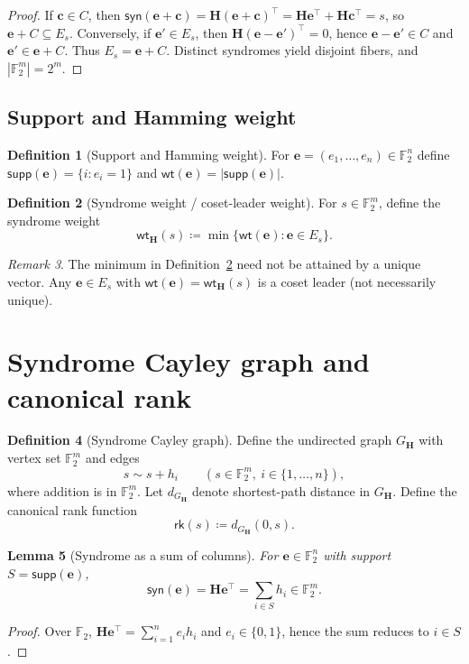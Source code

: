 \documentclass[11pt,twoside,leqno]{article}
\theoremstyle{definition}
\newtheorem{definition}{Definition}[section]
\theoremstyle{plain}
\newtheorem{lemma}[definition]{Lemma}
\theoremstyle{remark}
\newtheorem{remark}[definition]{Remark}
\newcommand{\Ftwo}{\mathbb{F}_2}
\newcommand{\wt}{\mathsf{wt}}
\newcommand{\supp}{\mathsf{supp}}
\newcommand{\syn}{\mathsf{syn}}
\newcommand{\rk}{\mathsf{rk}}
\newcommand{\HH}{\mathbf{H}}
\newcommand{\ee}{\mathbf{e}}
\newcommand{\cc}{\mathbf{c}}
\begin{document}
\begin{proof}
If $\cc\in C$, then $\syn(\ee+\cc)=\HH(\ee+\cc)^\top=\HH\ee^\top+\HH\cc^\top=s$,
so $\ee+C\subseteq E_s$. Conversely, if $\ee'\in E_s$, then
$\HH(\ee-\ee')^\top=0$, hence $\ee-\ee'\in C$ and $\ee'\in \ee+C$. Thus $E_s=\ee+C$.
Distinct syndromes yield disjoint fibers, and $|\Ftwo^m|=2^m$.
\end{proof}

\subsection{Support and Hamming weight}
\begin{definition}[Support and Hamming weight]\label{def:weight}
For $\ee=(e_1,\dots,e_n)\in\Ftwo^n$ define
$\supp(\ee)=\{i: e_i=1\}$ and $\wt(\ee)=|\supp(\ee)|$.
\end{definition}

\begin{definition}[Syndrome weight / coset-leader weight]\label{def:syndromewt}
For $s\in\Ftwo^m$, define the syndrome weight
\[
\wt_{\HH}(s)\coloneqq \min\{\wt(\ee): \ee\in E_s\}.
\]
\end{definition}

\begin{remark}
The minimum in Definition~\ref{def:syndromewt} need not be attained by a unique vector.
Any $\ee\in E_s$ with $\wt(\ee)=\wt_{\HH}(s)$ is a coset leader (not necessarily unique).
\end{remark}

\section{Syndrome Cayley graph and canonical rank}\label{sec:rank}

\begin{definition}[Syndrome Cayley graph]\label{def:cayley}
Define the undirected graph $G_\HH$ with vertex set $\Ftwo^m$ and edges
\[
s \sim s+h_i \qquad (s\in\Ftwo^m,\ i\in\{1,\dots,n\}),
\]
where addition is in $\Ftwo^m$. Let $d_{G_\HH}$ denote shortest-path distance in $G_\HH$.
Define the canonical rank function
\[
\rk(s)\coloneqq d_{G_\HH}(0,s).
\]
\end{definition}

\begin{lemma}[Syndrome as a sum of columns]\label{lem:syndrome-sum}
For $\ee\in\Ftwo^n$ with support $S=\supp(\ee)$,
\[
\syn(\ee)=\HH\ee^\top=\sum_{i\in S} h_i \in \Ftwo^m.
\]
\end{lemma}
\begin{proof}
Over $\Ftwo$, $\HH\ee^\top=\sum_{i=1}^n e_i h_i$ and $e_i\in\{0,1\}$, hence the sum reduces to $i\in S$.
\end{proof}
\end{document}
